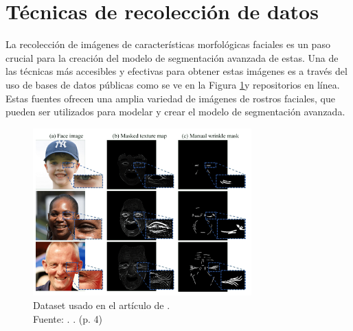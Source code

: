\section{Técnicas de recolección de datos}
La recolección de imágenes de características morfológicas faciales es un paso crucial para la creación del modelo de segmentación avanzada de estas. Una de las técnicas más accesibles y efectivas para obtener estas imágenes es a través del uso de bases de datos públicas como se ve en la Figura \ref{3:fig2}y repositorios en línea. Estas fuentes ofrecen una amplia variedad de imágenes de rostros faciales, que pueden ser utilizados para modelar y crear el modelo de segmentación avanzada.

\begin{figure}[h]
	\begin{center}
		\includegraphics[width=0.75\textwidth]{3/figures/datapaper.png}
		\caption[Dataset usado en el artículo de \cite{moon2024dermatology}]{Dataset usado en el artículo de \cite{moon2024dermatology}.\\
		Fuente: \cite{moon2024dermatology}. . (p. 4)}
		\label{3:fig2}
	\end{center}
\end{figure}

